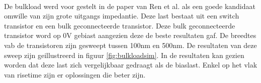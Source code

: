 \paragraph{}
De bulkload werd voor gestelt in de paper van Ren et al. \cite{bulkload} als een goede kandidaat omwille van zijn grote uitgangs impedantie. Deze last bestaat uit een switch transistor en een bulk geconnecteerde transistor. Deze bulk geconnecteerde transistor word op 0V gebiast aangezien deze de beste resultaten gaf. De breedtes vab de transistoren zijn gesweept tussen 100nm en 500nm. De resultaten van deze sweep zijn geillustreerd in figuur \ref{fig:bulkloadsim}. In de resultaten kan gezien worden dat deze last zich vergelijkbaar gedraagt als de biaslast. Enkel op het vlak van risetime zijn er oplossingen die beter zijn.

